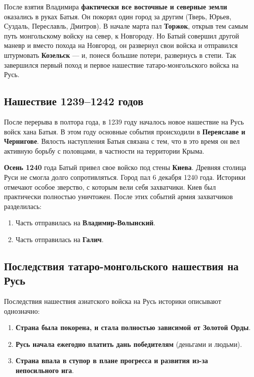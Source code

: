 \documentclass{article}
\begin{document}
После взятия Владимира \textbf{фактически все восточные и северные земли} оказались в руках Батыя. Он покорял один город за другим (Тверь, Юрьев, Суздаль, Переславль, Дмитров). В начале марта пал \textbf{Торжок}, открыв тем самым путь монгольскому войску на север, к Новгороду. Но Батый совершил другой маневр и вместо похода на Новгород, он развернул свои войска и отправился штурмовать \textbf{Козельск} — и, понеся большие потери, развернусь в степи. Так завершился первый поход и первое нашествие татаро-монгольского войска на Русь.

\subsection{Нашествие 1239–1242 годов}

После перерыва в полтора года, в 1239 году началось новое нашествие на Русь войск хана Батыя. В этом году основные события происходили в \textbf{Переяславе и Чернигове}. Вялость наступления Батыя связана с тем, что в это время он вел активную борьбу с половцами, в частности на территории Крыма.

\hfill

\textbf{Осень 1240} года Батый привел свое войско под стены \textbf{Киева}. Древняя столица Руси не смогла долго сопротивляться. Город пал 6 декабря 1240 года. Историки отмечают особое зверство, с которым вели себя захватчики. Киев был практически полностью уничтожен. После этих событий армия захватчиков разделилась:

\begin{enumerate}
    \item Часть отправилась на \textbf{Владимир-Волынский}.
    \item Часть отправилась на \textbf{Галич}.
\end{enumerate}

\subsection{Последствия татаро-монгольского нашествия на Русь}

Последствия нашествия азиатского войска на Русь историки описывают однозначно:

\begin{enumerate}
    \item \textbf{Страна была покорена, и стала полностью зависимой от Золотой Орды}.
    \item \textbf{Русь начала ежегодно платить дань победителям} (деньгами и людьми).
    \item \textbf{Страна впала в ступор в плане прогресса и развития из-за непосильного ига}.
\end{enumerate}
\end{document}

